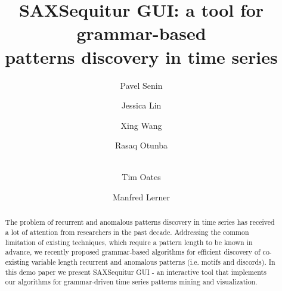 \documentclass{llncs}
\title{SAXSequitur GUI: a tool for grammar-based\\ patterns discovery in time series}
\begin{document}
 
\author{Pavel Senin \and Jessica Lin  \and Xing Wang  \and Rasaq Otunba  \and \\ Tim Oates \and Manfred Lerner }

\maketitle

\begin{abstract}
The problem of recurrent and anomalous patterns discovery in time series has received a lot of attention from researchers in the past decade. Addressing the common limitation of existing techniques, which require a pattern length to be known in advance, we recently proposed grammar-based algorithms for efficient discovery of co-existing variable length recurrent and anomalous patterns (i.e. motifs and discords). In this demo paper we present SAXSequitur GUI - an interactive tool that implements our algorithms for grammar-driven time series patterns mining and visualization.
\end{abstract}


\end{document}
